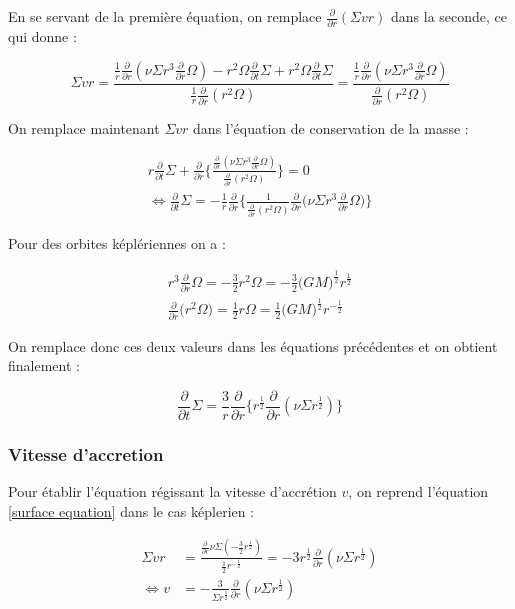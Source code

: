 \documentclass[a4paper,12pt]{article}
\newcommand{\derivt}[1]{\frac{\partial}{\partial t} #1}
\newcommand{\derivr}[1]{\frac{\partial}{\partial r} #1}
\begin{document}
En se servant de la première équation, on remplace $\derivr(\Sigma vr)$ dans la seconde, ce qui donne :

\begin{equation}
\label{surface equation}
    \Sigma vr = \frac{\frac{1}{r}\derivr{(\nu \Sigma r^3 \derivr\Omega)}-r^2\Omega \derivt{\Sigma}+r^2\Omega \derivt{\Sigma}}{\frac{1}{r}\derivr{(r^2 \Omega)}}=\frac{\frac{1}{r}\derivr{(\nu \Sigma r^3 \derivr\Omega)}}{\derivr{(r^2 \Omega)}}
\end{equation}

On remplace maintenant $\Sigma vr$ dans l'équation de conservation de la masse :

\begin{gather*}
    r\derivt{\Sigma} + \derivr{\bigg \{ \frac{\derivr{(\nu \Sigma r^3 \derivr\Omega)}}{\derivr{(r^2 \Omega)}}\bigg \}}=0\\
    \Leftrightarrow \derivt{\Sigma}=-\frac{1}{r}\derivr{\bigg \{ \frac{1}{\derivr{(r^2\Omega)}} \derivr{\Big(\nu \Sigma r^3 \derivr{\Omega}\Big)} \bigg \} }
\end{gather*}

Pour des orbites képlériennes on a :

\begin{gather*}
    r^3\derivr{\Omega} = -\frac{3}{2}r^2\Omega = -\frac{3}{2}\big( GM \big)^{\frac{1}{2}}r^{\frac{1}{2}}\\
    \derivr{\big( r^2\Omega \big)} = \frac{1}{2}r\Omega = \frac{1}{2} \big( GM \big)^{\frac{1}{2}}r^{-\frac{1}{2}}
\end{gather*}

On remplace donc ces deux valeurs dans les équations précédentes et on obtient finalement :

\begin{equation*}
    \derivt{\Sigma} = \frac{3}{r}\derivr{ \big \{ r^{\frac{1}{2}} \derivr{(\nu \Sigma r^{\frac{1}{2}})} \big \}}
\end{equation*}

\subsubsection{Vitesse d'accretion}

Pour établir l'équation régissant la vitesse d'accrétion $v$, on reprend l'équation \eqref{surface equation} dans le cas képlerien :

\begin{equation*}
    \begin{split}
         \Sigma vr &= \frac{\derivr{\nu \Sigma (-\frac{3}{2}r^{\frac{1}{2}})}}{\frac{1}{2}r^{-\frac{1}{2}}} = -3r^{\frac{1}{2}}\derivr{(\nu \Sigma r^{\frac{1}{2}})}\\
         \Leftrightarrow v &= -\frac{3}{\Sigma r^{\frac{1}{2}}}\derivr{(\nu \Sigma r^{\frac{1}{2}})}
    \end{split}
\end{equation*}
\end{document}
